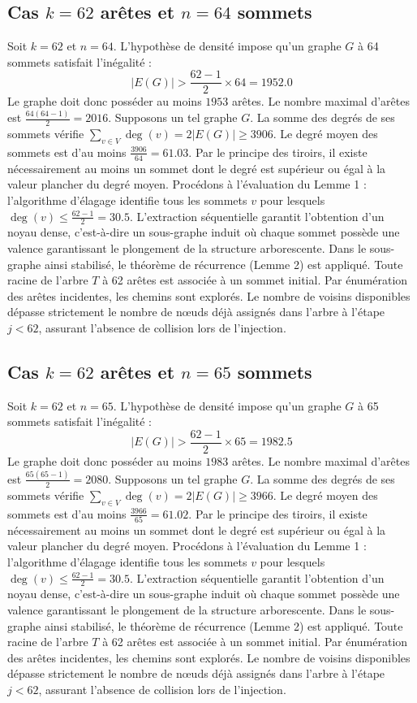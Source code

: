 \documentclass[12pt,a4paper]{article}
\begin{document}
\subsection{Cas $k = 62$ arêtes et $n = 64$ sommets}
Soit $k = 62$ et $n = 64$. L'hypothèse de densité impose qu'un graphe $G$ à 64 sommets satisfait l'inégalité :
$$ |E(G)| > \frac{62-1}{2} \times 64 = 1952.0 $$
Le graphe doit donc posséder au moins $1953$ arêtes. Le nombre maximal d'arêtes est $\frac{64(64-1)}{2} = 2016$.
Supposons un tel graphe $G$. La somme des degrés de ses sommets vérifie $\sum_{v \in V} \deg(v) = 2|E(G)| \geq 3906$.
Le degré moyen des sommets est d'au moins $\frac{3906}{64} = 61.03$.
Par le principe des tiroirs, il existe nécessairement au moins un sommet dont le degré est supérieur ou égal à la valeur plancher du degré moyen.
Procédons à l'évaluation du Lemme 1 : l'algorithme d'élagage identifie tous les sommets $v$ pour lesquels $\deg(v) \leq \frac{62-1}{2} = 30.5$.
L'extraction séquentielle garantit l'obtention d'un noyau dense, c'est-à-dire un sous-graphe induit où chaque sommet possède une valence garantissant le plongement de la structure arborescente.
Dans le sous-graphe ainsi stabilisé, le théorème de récurrence (Lemme 2) est appliqué. Toute racine de l'arbre $T$ à 62 arêtes est associée à un sommet initial. Par énumération des arêtes incidentes, les chemins sont explorés. Le nombre de voisins disponibles dépasse strictement le nombre de nœuds déjà assignés dans l'arbre à l'étape $j < 62$, assurant l'absence de collision lors de l'injection.

\subsection{Cas $k = 62$ arêtes et $n = 65$ sommets}
Soit $k = 62$ et $n = 65$. L'hypothèse de densité impose qu'un graphe $G$ à 65 sommets satisfait l'inégalité :
$$ |E(G)| > \frac{62-1}{2} \times 65 = 1982.5 $$
Le graphe doit donc posséder au moins $1983$ arêtes. Le nombre maximal d'arêtes est $\frac{65(65-1)}{2} = 2080$.
Supposons un tel graphe $G$. La somme des degrés de ses sommets vérifie $\sum_{v \in V} \deg(v) = 2|E(G)| \geq 3966$.
Le degré moyen des sommets est d'au moins $\frac{3966}{65} = 61.02$.
Par le principe des tiroirs, il existe nécessairement au moins un sommet dont le degré est supérieur ou égal à la valeur plancher du degré moyen.
Procédons à l'évaluation du Lemme 1 : l'algorithme d'élagage identifie tous les sommets $v$ pour lesquels $\deg(v) \leq \frac{62-1}{2} = 30.5$.
L'extraction séquentielle garantit l'obtention d'un noyau dense, c'est-à-dire un sous-graphe induit où chaque sommet possède une valence garantissant le plongement de la structure arborescente.
Dans le sous-graphe ainsi stabilisé, le théorème de récurrence (Lemme 2) est appliqué. Toute racine de l'arbre $T$ à 62 arêtes est associée à un sommet initial. Par énumération des arêtes incidentes, les chemins sont explorés. Le nombre de voisins disponibles dépasse strictement le nombre de nœuds déjà assignés dans l'arbre à l'étape $j < 62$, assurant l'absence de collision lors de l'injection.
\end{document}
